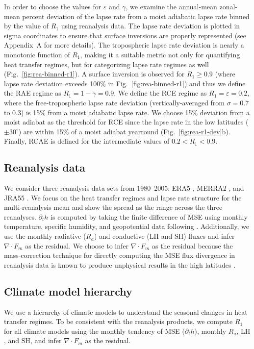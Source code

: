 \documentclass{ametsocV5}
\begin{document}
    In order to choose the values for $\varepsilon$ and $\gamma$, we examine the annual-mean zonal-mean percent deviation of the lapse rate from a moist adiabatic lapse rate binned by the value of $R_1$ using reanalysis data. The lapse rate deviation is plotted in sigma coordinates to ensure that surface inversions are properly represented (see Appendix~A for more details). The tropospheric lapse rate deviation is nearly a monotonic function of $R_1$, making it a suitable metric not only for quantifying heat transfer regimes, but for categorizing lapse rate regimes as well (Fig.~\ref{fig:rea-binned-r1}). A surface inversion is observed for $R_1 \ge 0.9$ (where lapse rate deviation exceeds 100\% in Fig.~\ref{fig:rea-binned-r1}) and thus we define the RAE regime as $R_1=1-\gamma=0.9$. We define the RCE regime as $R_1=\varepsilon=0.2$, where the free-tropospheric lapse rate deviation (vertically-averaged from $\sigma=0.7$ to 0.3) is 15\% from a moist adiabatic lapse rate. We choose 15\% deviation from a moist adiabat as the threshold for RCE since the lapse rate in the low latitudes ($\pm 30^\circ$) are within 15\% of a moist adiabat yearround (Fig.~\ref{fig:rea-r1-dev}b). Finally, RCAE is defined for the intermediate values of $0.2<R_1<0.9$.

    \subsection{Reanalysis data}\label{subsec:reanalysis}

    We consider three reanalysis data sets from 1980--2005: ERA5 \citep{hersbach2020}, MERRA2 \citep{gelaro2017}, and JRA55 \citep{kobayashi2015}. We focus on the heat transfer regimes and lapse rate structure for the multi-reanalysis mean and show the spread as the range across the three reanalyses. $\partial_t h$ is computed by taking the finite difference of MSE using monthly temperature, specific humidity, and geopotential data following \cite{}. Additionally, we use the monthly radiative ($R_a$) and conductive ($\mathrm{LH}$ and $\mathrm{SH}$) fluxes and infer $\nabla\cdot F_m$ as the residual. We choose to infer $\nabla\cdot F_m$ as the residual because the mass-correction technique for directly computing the MSE flux divergence in reanalysis data is known to produce unphysical results in the high latitudes \citep{porter2010}. 

    \subsection{Climate model hierarchy}\label{subsec:models}
    We use a hierarchy of climate models to understand the seasonal changes in heat transfer regimes. To be consistent with the reanalysis products, we compute $R_1$ for all climate models using the monthly tendency of MSE ($\partial_t h$), monthly $R_a$, $\mathrm{LH}$, and $\mathrm{SH}$, and infer $\nabla\cdot F_m $ as the residual.
\end{document}
